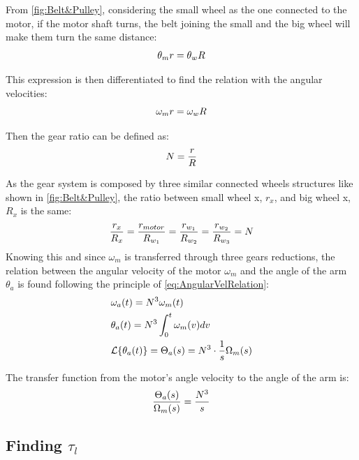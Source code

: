 From \autoref{fig:Belt&Pulley}, considering the small wheel as the one connected to the motor, if the motor shaft turns, the belt joining the small and the big wheel will make them turn the same distance:
\begin{equation}
	\theta_m r = \theta_w R \addunit{\meter}
\end{equation}

This expression is then differentiated to find the relation with the angular velocities:
\begin{equation}
	\omega_m r = \omega_w R\addunit{\meter\per\second}
	\label{eq:AngularVelRelation}
\end{equation}

Then the gear ratio can be defined as: 
\begin{equation}
	N = \frac{r}{R} \addunit{1}
	\label{eq:GearRatio}
\end{equation}

As the gear system is composed by three similar connected wheels structures like shown in \autoref{fig:Belt&Pulley}, the ratio between small wheel x, $r_x$, and big wheel x, $R_x$ is the same:
\begin{equation}
	\frac{r_x}{R_x} = \frac{r_{motor}}{R_{w_1}} = \frac{r_{w_1}}{R_{w_2}} = \frac{r_{w_2}}{R_{w_3}} = N \addunit{1}
\end{equation}
Knowing this and since $\omega_m$ is transferred through three gears reductions, the relation between the angular velocity of the motor $\omega_m$ and the angle of the arm $\theta_a$ is found following the principle of \autoref{eq:AngularVelRelation}:
\begin{subequations} \label{eq:tech_ToA}
	\begin{flalign}
		&\omega_a(t) = N^3 \omega_m(t) \\
		&\theta_a(t) = N^3 \int_{0}^{t}\omega_m(v) dv \\
		&\mathcal{L}\{\theta_a(t)\} = \Theta_a(s) = N^3 \cdot \frac{1}{s} \Omega_m(s) \addunit{1}
	\end{flalign}
\end{subequations}

The transfer function from the motor's angle velocity to the angle of the arm is:
\begin{equation}\label{eq:thetaOmega}
	\frac{\Theta_a(s)}{\Omega_m(s)} =  \frac{N^3}{s} \addunit{1}
\end{equation}

\subsection{Finding $\tau_l$}

